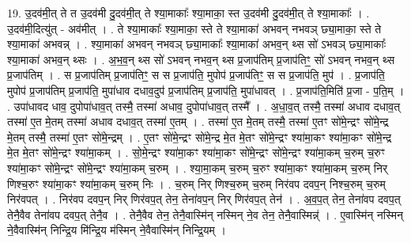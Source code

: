 \documentclass[17pt]{extarticle}
\begin{document}
19. उ॒दव॑मी॒त् ते त उ॒दव॑मी दु॒दव॑मी॒त् ते श्या॒माकाः᳚ श्या॒माका॒ स्त उ॒दव॑मी दु॒दव॑मी॒त् ते श्या॒माकाः᳚ । . उ॒दव॑मी॒दित्यु॑त् - अव॑मीत् । . ते श्या॒माकाः᳚ श्या॒माका॒ स्ते ते श्या॒माका॑ अभवन् नभवञ् छ्या॒माका॒ स्ते ते श्या॒माका॑ अभवन्न् । . श्या॒माका॑ अभवन् नभवञ् छ्या॒माकाः᳚ श्या॒माका॑ अभव॒न् थ्स सो॑ ऽभवञ् छ्या॒माकाः᳚ श्या॒माका॑ अभव॒न् थ्सः । . अ॒भ॒व॒न् थ्स सो॑ ऽभवन् नभव॒न् थ्स प्र॒जाप॑तिम् प्र॒जाप॑तिꣳ॒॒ सो॑ ऽभवन् नभव॒न् थ्स प्र॒जाप॑तिम् । . स प्र॒जाप॑तिम् प्र॒जाप॑तिꣳ॒॒ स स प्र॒जाप॑ति॒ मुपोप॑ प्र॒जाप॑तिꣳ॒॒ स स प्र॒जाप॑ति॒ मुप॑ । . प्र॒जाप॑ति॒ मुपोप॑ प्र॒जाप॑तिम् प्र॒जाप॑ति॒ मुपा॑धाव दधाव॒दुप॑ प्र॒जाप॑तिम् प्र॒जाप॑ति॒ मुपा॑धावत् । . प्र॒जाप॑ति॒मिति॑ प्र॒जा - प॒ति॒म् । . उपा॑धावद धाव॒ दुपोपा॑धाव॒त् तस्मै॒ तस्मा॑ अधाव॒ दुपोपा॑धाव॒त् तस्मै᳚ । . अ॒धा॒व॒त् तस्मै॒ तस्मा॑ अधाव दधाव॒त् तस्मा॑ ए॒त मे॒तम् तस्मा॑ अधाव दधाव॒त् तस्मा॑ ए॒तम् । . तस्मा॑ ए॒त मे॒तम् तस्मै॒ तस्मा॑ ए॒तꣳ सो॑मे॒न्द्रꣳ सो॑मे॒न्द्र मे॒तम् तस्मै॒ तस्मा॑ ए॒तꣳ सो॑मे॒न्द्रम् । . ए॒तꣳ सो॑मे॒न्द्रꣳ सो॑मे॒न्द्र मे॒त मे॒तꣳ सो॑मे॒न्द्रꣳ श्या॑मा॒कꣳ श्या॑मा॒कꣳ सो॑मे॒न्द्र मे॒त मे॒तꣳ सो॑मे॒न्द्रꣳ श्या॑मा॒कम् । . सो॒मे॒न्द्रꣳ श्या॑मा॒कꣳ श्या॑मा॒कꣳ सो॑मे॒न्द्रꣳ सो॑मे॒न्द्रꣳ श्या॑मा॒कम् च॒रुम् च॒रुꣳ श्या॑मा॒कꣳ सो॑मे॒न्द्रꣳ सो॑मे॒न्द्रꣳ श्या॑मा॒कम् च॒रुम् । . श्या॒मा॒कम् च॒रुम् च॒रुꣳ श्या॑मा॒कꣳ श्या॑मा॒कम् च॒रुम् निर् णिश्च॒रुꣳ श्या॑मा॒कꣳ श्या॑मा॒कम् च॒रुम् निः । . च॒रुम् निर् णिश्च॒रुम् च॒रुम् निर॑वप दवप॒न् निश्च॒रुम् च॒रुम् निर॑वपत् । . निर॑वप दवप॒न् निर् णिर॑वप॒त् तेन॒ तेना॑वप॒न् निर् णिर॑वप॒त् तेन॑ । . अ॒व॒प॒त् तेन॒ तेना॑वप दवप॒त् तेनै॒वैव तेना॑वप दवप॒त् तेनै॒व । . तेनै॒वैव तेन॒ तेनै॒वास्मि॑न् नस्मिन् ने॒व तेन॒ तेनै॒वास्मिन्न्॑ । . ए॒वास्मि॑न् नस्मिन् ने॒वैवास्मि॑न् निन्द्रि॒य मि॑न्द्रि॒य म॑स्मिन् ने॒वैवास्मि॑न् निन्द्रि॒यम् । \newline
\end{document}
